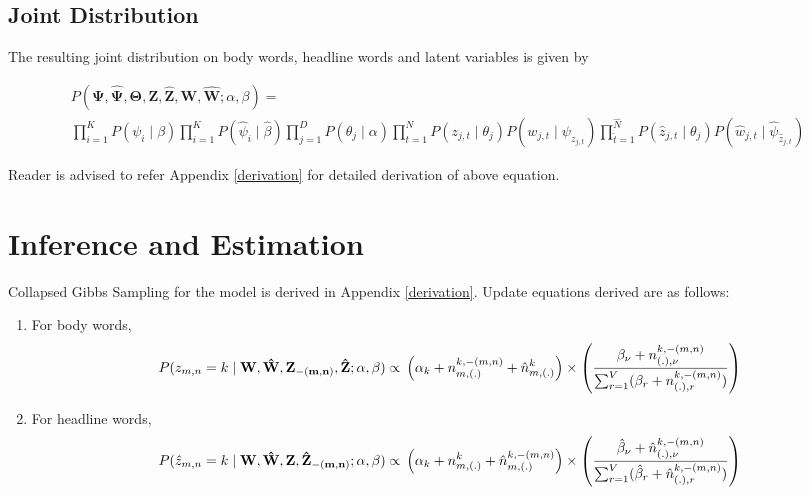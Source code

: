 \documentclass[a4paper]{article}
\begin{document}
\subsection{Joint Distribution}
The resulting joint distribution on body words, headline words and latent variables is given by 

\begin{multline}
P(\mathbf{\Psi}, \mathbf{\hat{\Psi}}, \mathbf{\Theta},  \mathbf{Z}, \mathbf{\hat{Z}}, \mathbf{W}, \mathbf{\hat{W}} ; \alpha, \beta) =  \\
\prod_{i=1}^{K} P(\psi_{i} \mid \beta) \prod_{i=1}^{K} P(\hat{\psi}_{i} \mid \hat{\beta}) \prod_{j=1}^{D} P(\theta_{j} \mid \alpha) \prod_{t=1}^{N} P(z_{j,t} \mid \theta_{j})P(w_{j,t} \mid \psi_{z_{j,t}}) \prod_{\hat{t}=1}^{\hat{N}} P(\hat{z}_{j,t} \mid \theta_{j})P(\hat{w}_{j,t} \mid \hat{\psi}_{\hat{z}_{j,t}})
\end{multline}

Reader is advised to refer Appendix \ref{derivation} for detailed derivation of above equation.
\section{Inference and Estimation}

Collapsed Gibbs Sampling for the model is derived in Appendix \ref{derivation}. Update equations derived are as follows:
\begin{enumerate}
\item For body words,
  \begin{displaymath}
   P(z_{m,n} = k \mid \mathbf{W}, \mathbf{\hat{W}}, \mathbf{Z_{-(m,n)}}, \mathbf{\hat{Z}} ; \alpha, \beta ) 
 \propto \\ 
 \left( \alpha_{k} + n_{m,(.)}^{k,-(m,n)} + \hat{n}_{m,(.)}^{k} \right) \times \left( \frac{\beta_{\nu} + n_{(.),\nu}^{k,-(m,n)}}{\sum_{r=1}^{V}(\beta_{r} + n_{(.),r}^{k,-(m,n)})} \right)
  \end{displaymath} 
  
\item For headline words,
  \begin{displaymath}
   P(\hat{z}_{m,n} = k \mid \mathbf{W}, \mathbf{\hat{W}}, \mathbf{Z}, \mathbf{\hat{Z}_{-(m,n)}} ; \alpha, \beta ) 
 \propto \\ 
 \left( \alpha_{k} + n_{m,(.)}^{k} + \hat{n}_{m,(.)}^{k,-(m,n)} \right) \times \left( \frac{\hat{\beta}_{\nu} + \hat{n}_{(.),\nu}^{k,-(m,n)}}{\sum_{r=1}^{V}(\hat{\beta}_{r} + \hat{n}_{(.),r}^{k,-(m,n)})} \right)
  \end{displaymath}
\end{enumerate}
\end{document}
